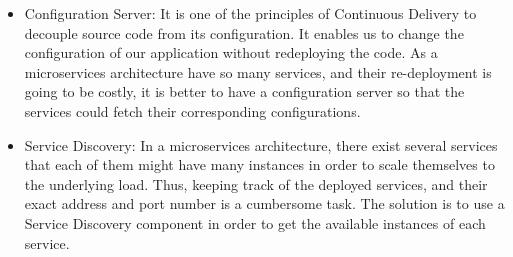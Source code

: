 \begin{itemize}
	\item Configuration Server: It is one of the principles of Continuous Delivery to decouple source code from its configuration. It enables us to change the configuration of our application without redeploying the code. As a microservices architecture have so many services, and their re-deployment is going to be costly, it is better to have a configuration server so that the services could fetch their corresponding configurations.
\item Service Discovery: 
In a microservices architecture, there exist several services that each of them might have many instances in order to scale themselves to the underlying load. Thus, keeping track of the deployed services, and their exact address and port number is a cumbersome task. The solution is to use a Service Discovery component in order to get the available instances of each service.		
\end{itemize}